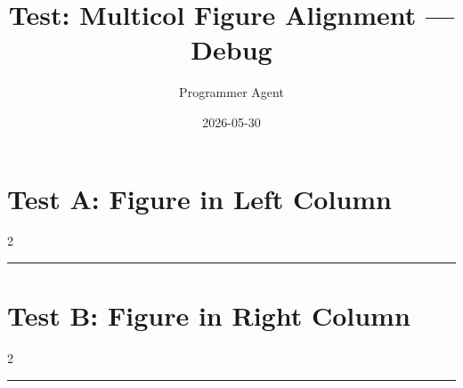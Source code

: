 \documentclass[a4paper,11pt]{article}
\title{Test: Multicol Figure Alignment — Debug}
\author{Programmer Agent}
\date{2026-05-30}
\begin{document}
\maketitle

\section*{Test A: Figure in Left Column}
\begin{multicols}{2}
  \begin{swarmwrap}%
    \begin{minipage}[t]{2cm}
      \centering
      \rule{\linewidth}{2.8cm}
    \end{minipage}%
  \end{swarmwrap}%
  \swarmwrapnext
  \lipsum[1-3]
\end{multicols}

\section*{Test B: Figure in Right Column}
\begin{multicols}{2}
  \lipsum[1-2]%
  \begin{swarmwrap}%
    \begin{minipage}[t]{2cm}
      \centering
      \rule{\linewidth}{2.8cm}
    \end{minipage}%
  \end{swarmwrap}%
  \swarmwrapnext
  \lipsum[3-5]
\end{multicols}

\end{document}
